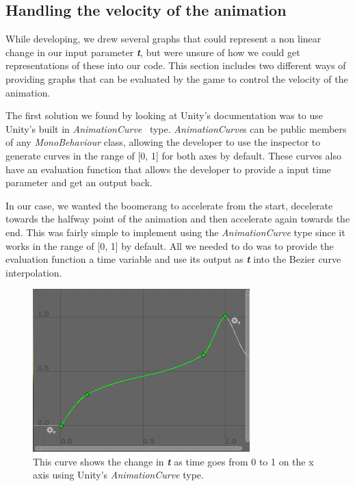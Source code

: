 \subsection{Handling the velocity of the animation}
While developing, we drew several graphs that could represent a non linear change in our input parameter \textbf{\textit{t}}, but were unsure of how we could get representations of these into our code. This section includes two different ways of providing graphs that can be evaluated by the game to control the velocity of the animation.

The first solution we found by looking at Unity's documentation was to use Unity's built in \emph{AnimationCurve}~\cite{unityDocumentationAnimationCurve} type. \emph{AnimationCurve}s can be public members of any \emph{MonoBehaviour} class, allowing the developer to use the inspector to generate curves in the range of [0, 1] for both axes by default. These curves also have an evaluation function that allows the developer to provide a input time parameter and get an output back. 

In our case, we wanted the boomerang to accelerate from the start, decelerate towards the halfway point of the animation and then accelerate again towards the end. This was fairly simple to implement using the \emph{AnimationCurve} type since it works in the range of [0, 1] by default. All we needed to do was to provide the evaluation function a time variable and use its output as \textbf{\textit{t}} into the Bezier curve interpolation. 
    
\begin{figure}[tbph]  %
  \centering
  \includegraphics[width=.75\textwidth]{images/BoomerangAnimationCurve}
  \caption[Boomerang animation curve using Unity's built in type]{This curve shows the change in \textbf{\textit{t}} as time goes from 0 to 1 on the x axis using Unity's \emph{AnimationCurve} type.}
  \label{fig:boomerangcurve0}
\end{figure}

